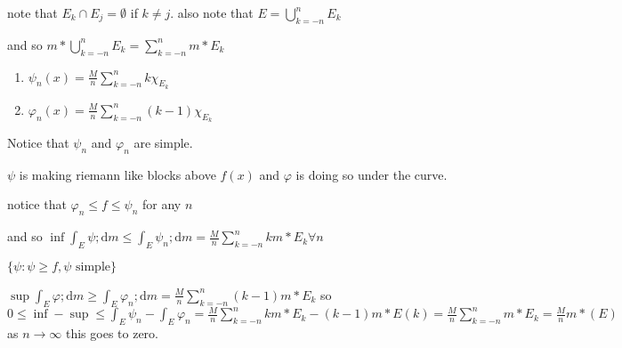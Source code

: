 \documentclass[letterpaper]{article}
\begin{document}
note that $E_k\cap E_j=\emptyset$ if $k\ne j$. also note that $E=\bigcup\limits_{k=-n}^n E_k$

and so $m*\bigcup\limits_{k=-n}^n E_k=\sum\limits_{k=-n}^n m*E_k$

\begin{enumerate}
\item
$\psi_n(x)=\frac{M}{n}\sum\limits_{k=-n}^n{k\chi_{E_k}}$
\item
$\varphi_n(x)=\frac{M}{n}\sum\limits_{k=-n}^n{(k-1)\chi_{E_k}}$
\end{enumerate}
Notice that $\psi_n$ and $\varphi_n$ are simple.

$\psi$ is making riemann like blocks above $f(x)$ and $\varphi$ is doing so under the curve.

notice that $\varphi_n\le f\le \psi_n$ for any $n$

and so $\inf\int_E{\psi;\mathrm{d}m}\le \int_E{\psi_n;\mathrm{d}m}=\frac{M}{n}\sum\limits_{k=-n}^n{km*E_k}\forall n$

$\{\psi:\psi\ge f, \psi\text{ simple}\}$

$\sup\int_E{\varphi;\mathrm{d}m}\ge \int_{E}{\varphi_n;\mathrm{d}m}=\frac{M}{n}\sum\limits_{k=-n}^n{(k-1)m*E_k}$ so $0\le \inf-\sup\le \int_E{\psi_n}-\int_E\varphi_n=\frac{M}{n}\sum\limits_{k=-n}^n{km*E_k-(k-1)m*E(k)}=\frac{M}{n}\sum\limits_{k=-n}^n{m*E_k}=\frac{M}{n}m*(E)$ as $n\to\infty$ this goes to zero.
\end{document}
